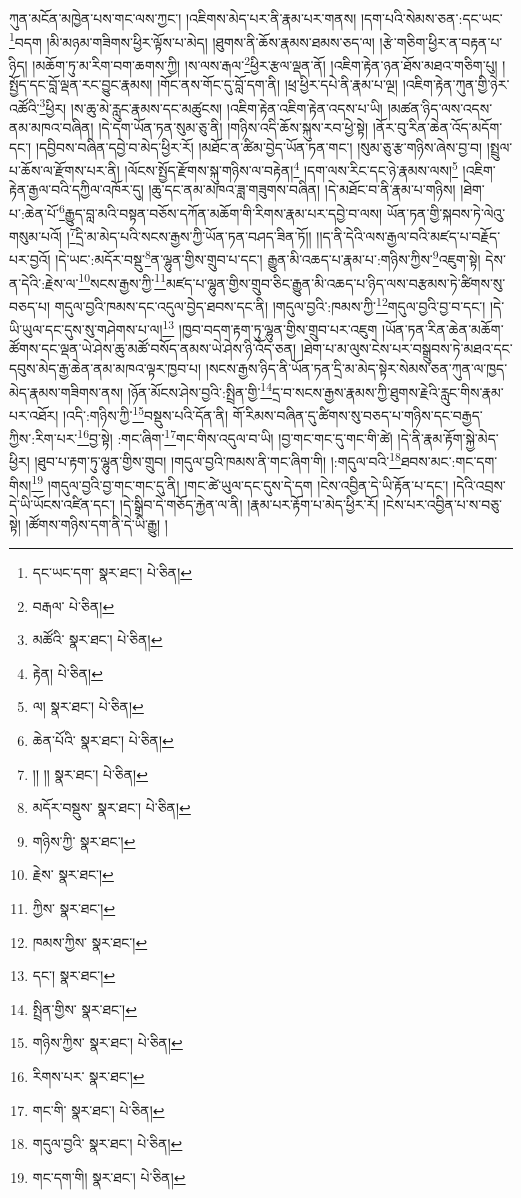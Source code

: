 ཀུན་མངོན་མཁྱེན་པས་གང་ལས་ཀྱང་། །འཇིགས་མེད་པར་ནི་རྣམ་པར་གནས། །དག་པའི་སེམས་ཅན་:དང་ཡང་\footnote{དང་ཡང་དག་  སྣར་ཐང་།  པེ་ཅིན། }བདག །མི་མཉམ་གཟིགས་ཕྱིར་ལྟོས་པ་མེད། །ཐུགས་ནི་ཆོས་རྣམས་ཐམས་ཅད་ལ། །རྩེ་གཅིག་ཕྱིར་ན་བརྟན་པ་ཉིད། །མཆོག་ཏུ་མ་རིག་བག་ཆགས་ཀྱི། །ས་ལས་རྒལ་\footnote{བརྒལ་  པེ་ཅིན། }ཕྱིར་རྩལ་ལྡན་ནོ། །འཇིག་རྟེན་ཉན་ཐོས་མཐའ་གཅིག་པུ། །སྤྱོད་དང་བློ་ལྡན་རང་བྱུང་རྣམས། །གོང་ནས་གོང་དུ་བློ་དག་ནི། །ཕྲ་ཕྱིར་དཔེ་ནི་རྣམ་པ་ལྔ། །འཇིག་རྟེན་ཀུན་གྱི་ཉེར་འཚོའི་\footnote{མཚོའི་  སྣར་ཐང་།  པེ་ཅིན། }ཕྱིར། །ས་ཆུ་མེ་རླུང་རྣམས་དང་མཚུངས། །འཇིག་རྟེན་འཇིག་རྟེན་འདས་པ་ཡི། །མཚན་ཉིད་ལས་འདས་ནམ་མཁའ་བཞིན། །དེ་དག་ཡོན་ཏན་སུམ་ཅུ་ནི། །གཉིས་འདི་ཆོས་སྐུས་རབ་ཕྱེ་སྟེ། །ནོར་བུ་རིན་ཆེན་འོད་མདོག་དང་། །དབྱིབས་བཞིན་དབྱེ་བ་མེད་ཕྱིར་རོ། །མཐོང་ན་ཚིམ་བྱེད་ཡོན་ཏན་གང་། །སུམ་ཅུ་རྩ་གཉིས་ཞེས་བྱ་བ། །སྤྲུལ་པ་ཆོས་ལ་རྫོགས་པར་ནི། །ལོངས་སྤྱོད་རྫོགས་སྐུ་གཉིས་ལ་བརྟེན།\footnote{རྟེན།  པེ་ཅིན། } །དག་ལས་རིང་དང་ཉེ་རྣམས་ལས།\footnote{ལ།  སྣར་ཐང་།  པེ་ཅིན། } །འཇིག་རྟེན་རྒྱལ་བའི་དཀྱིལ་འཁོར་དུ། །ཆུ་དང་ནམ་མཁའ་ཟླ་གཟུགས་བཞིན། །དེ་མཐོང་བ་ནི་རྣམ་པ་གཉིས། །ཐེག་པ་:ཆེན་པོ་\footnote{ཆེན་པོའི་  སྣར་ཐང་།  པེ་ཅིན། }རྒྱུད་བླ་མའི་བསྟན་བཅོས་དཀོན་མཆོག་གི་རིགས་རྣམ་པར་དབྱེ་བ་ལས། ཡོན་ཏན་གྱི་སྐབས་ཏེ་ལེའུ་གསུམ་པའོ། །\footnote{།། །།  སྣར་ཐང་།  པེ་ཅིན། }དྲི་མ་མེད་པའི་སངས་རྒྱས་ཀྱི་ཡོན་ཏན་བཤད་ཟིན་ཏོ།། །།ད་ནི་དེའི་ལས་རྒྱལ་བའི་མཛད་པ་བརྗོད་པར་བྱའོ། །དེ་ཡང་:མདོར་བསྡུ་\footnote{མདོར་བསྡུས་  སྣར་ཐང་།  པེ་ཅིན། }ན་ལྷུན་གྱིས་གྲུབ་པ་དང་། རྒྱུན་མི་འཆད་པ་རྣམ་པ་:གཉིས་ཀྱིས་\footnote{གཉིས་ཀྱི་  སྣར་ཐང་། }འཇུག་སྟེ། དེས་ན་དེའི་:རྗེས་ལ་\footnote{རྗེས་  སྣར་ཐང་། }སངས་རྒྱས་ཀྱི་\footnote{ཀྱིས་  སྣར་ཐང་། }མཛད་པ་ལྷུན་གྱིས་གྲུབ་ཅིང་རྒྱུན་མི་འཆད་པ་ཉིད་ལས་བརྩམས་ཏེ་ཚིགས་སུ་བཅད་པ། གདུལ་བྱའི་ཁམས་དང་འདུལ་བྱེད་ཐབས་དང་ནི། །གདུལ་བྱའི་:ཁམས་ཀྱི་\footnote{ཁམས་ཀྱིས་  སྣར་ཐང་། }གདུལ་བྱའི་བྱ་བ་དང་། །དེ་ཡི་ཡུལ་དང་དུས་སུ་གཤེགས་པ་ལ།\footnote{དང་།  སྣར་ཐང་། } །ཁྱབ་བདག་རྟག་ཏུ་ལྷུན་གྱིས་གྲུབ་པར་འཇུག །ཡོན་ཏན་རིན་ཆེན་མཆོག་ཚོགས་དང་ལྡན་ཡེ་ཤེས་ཆུ་མཚོ་བསོད་ནམས་ཡེ་ཤེས་ཉི་འོད་ཅན། །ཐེག་པ་མ་ལུས་ངེས་པར་བསྒྲུབས་ཏེ་མཐའ་དང་དབུས་མེད་རྒྱ་ཆེན་ནམ་མཁའ་ལྟར་ཁྱབ་པ། །སངས་རྒྱས་ཉིད་ནི་ཡོན་ཏན་དྲི་མ་མེད་སྟེར་སེམས་ཅན་ཀུན་ལ་ཁྱད་མེད་རྣམས་གཟིགས་ནས། །ཉོན་མོངས་ཤེས་བྱའི་:སྤྲིན་གྱི་\footnote{སྤྲིན་གྱིས་  སྣར་ཐང་། }དྲ་བ་སངས་རྒྱས་རྣམས་ཀྱི་ཐུགས་རྗེའི་རླུང་གིས་རྣམ་པར་འཐོར། །འདི་:གཉིས་ཀྱི་\footnote{གཉིས་ཀྱིས་  སྣར་ཐང་།  པེ་ཅིན། }བསྡུས་པའི་དོན་ནི། གོ་རིམས་བཞིན་དུ་ཚིགས་སུ་བཅད་པ་གཉིས་དང་བརྒྱད་ཀྱིས་:རིག་པར་\footnote{རིགས་པར་  སྣར་ཐང་། }བྱ་སྟེ། :གང་ཞིག་\footnote{གང་གི་  སྣར་ཐང་།  པེ་ཅིན། }གང་གིས་འདུལ་བ་ཡི། །བྱ་གང་གང་དུ་གང་གི་ཚེ། །དེ་ནི་རྣམ་རྟོག་སྐྱེ་མེད་ཕྱིར། །ཐུབ་པ་རྟག་ཏུ་ལྷུན་གྱིས་གྲུབ། །གདུལ་བྱའི་ཁམས་ནི་གང་ཞིག་གི། །:གདུལ་བའི་\footnote{གདུལ་བྱའི་  སྣར་ཐང་།  པེ་ཅིན། }ཐབས་མང་:གང་དག་གིས།\footnote{གང་དག་གི།  སྣར་ཐང་།  པེ་ཅིན། } །གདུལ་བྱའི་བྱ་གང་གང་དུ་ནི། །གང་ཚེ་ཡུལ་དང་དུས་དེ་དག །ངེས་འབྱིན་དེ་ཡི་རྟོན་པ་དང་། །དེའི་འབྲས་དེ་ཡི་ཡོངས་འཛིན་དང་། །དེ་སྒྲིབ་དེ་གཅོད་རྐྱེན་ལ་ནི། །རྣམ་པར་རྟོག་པ་མེད་ཕྱིར་རོ། །ངེས་པར་འབྱིན་པ་ས་བཅུ་སྟེ། །ཚོགས་གཉིས་དག་ནི་དེ་ཡི་རྒྱུ། །
